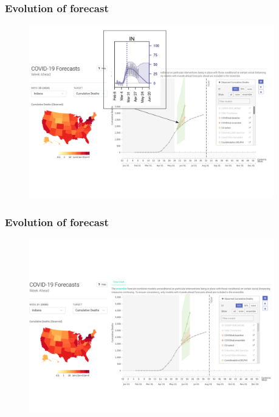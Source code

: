\documentclass[usenames,dvipsnames]{beamer}
\begin{document}
\begin{frame}
  \frametitle{Evolution of forecast}
    \begin{figure}
    \includegraphics[width=0.95\textwidth]{./images/FRED_forecast_up_2.png}
  \end{figure}
\end{frame}

\begin{frame}
  \frametitle{Evolution of forecast}
    \begin{figure}
    \includegraphics[width=0.95\textwidth]{./images/FRED_forecast_up_3.png}
  \end{figure}
\end{frame}
\end{document}
